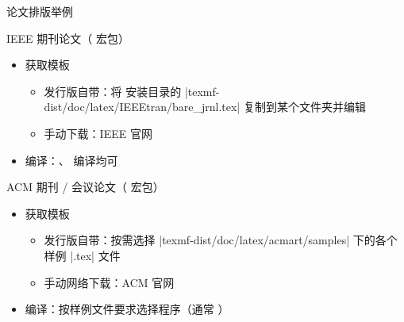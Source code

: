 \begin{frame}[fragile]{论文排版举例}
  \begin{exampleblock}{IEEE 期刊论文（ 宏包）}
    \begin{itemize}
      \item 获取模板
        \begin{itemize}
          \item 发行版自带：将 \TL 安装目录的 |texmf-dist/doc/latex/IEEEtran/bare_jrnl.tex| 复制到某个文件夹并编辑
          \item 手动下载：IEEE 官网 
        \end{itemize}
      \item 编译：\XeLaTeX{}、\pdfLaTeX{} 编译均可
    \end{itemize}
  \end{exampleblock}
  \begin{exampleblock}{ACM 期刊 / 会议论文（ 宏包）}
    \begin{itemize}
      \item 获取模板
        \begin{itemize}
          \item 发行版自带：按需选择 |texmf-dist/doc/latex/acmart/samples| 下的各个样例 |.tex| 文件
          \item 手动网络下载：ACM 官网 
        \end{itemize}
      \item 编译：按样例文件要求选择程序（通常 \pdfLaTeX{}）
    \end{itemize}
  \end{exampleblock}
\end{frame}

